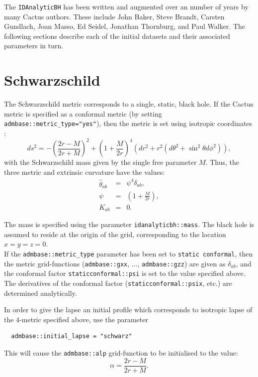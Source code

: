 \documentclass{article}
\begin{document}
The \texttt{IDAnalyticBH} has been written and augmented over an number of
years by many Cactus authors. These include John Baker, Steve Brandt,
Carsten Gundlach, Joan Masso, Ed Seidel, Jonathan Thornburg, and
Paul Walker.
The following sections describe each of the initial datasets
and their associated parameters in turn.

\section{Schwarzschild}

The Schwarzschild metric corresponds to a single, static, black hole.
If the Cactus metric is specified as a conformal metric (by setting
\texttt{admbase::metric\_type="yes"}), then the metric is
set using isotropic coordinates \cite{CactusEinstein_IDAnalyticBH_mtw-isotropic}:
\begin{equation}
  ds^2 = -\left(\frac{2r - M}{2r + M}\right)^2
  + \left(1 + \frac{M}{2r}\right)^4 \left(dr^2 + r^2(d\theta^2
  + \sin^2\theta d\phi^2)\right),
\end{equation}
with the Schwarzschild mass given by the single free parameter $M$.
Thus, the three metric and extrinsic curvature have the values:
\begin{eqnarray}
  \hat{g}_{ab} & = & \psi^4 \delta_{ab}, \\
  \psi & = & (1 + \frac{M}{2r}), \\
  K_{ab} & = & 0.
\end{eqnarray}

The mass is specified using the parameter
\texttt{idanalyticbh::mass}. The black hole is assumed to reside at
the origin of the grid, corresponding to the location $x=y=z=0$.\\

If the \texttt{admbase::metric\_type} parameter has been set to {\tt static conformal}, then
the metric grid-functions (\texttt{admbase::gxx}, $\ldots$,
\texttt{admbase::gzz}) are given as $\delta_{ab}$, and the conformal
factor \texttt{staticconformal::psi} is set to the value specified
above. The derivatives of the conformal factor
(\texttt{staticconformal::psix}, etc.) are determined analytically.

In order to give the lapse an initial profile which corresponds to
isotropic lapse of the $4$-metric specified above, use the parameter
\begin{verbatim}
  admbase::initial_lapse = "schwarz"
\end{verbatim}
This will cause the \texttt{admbase::alp} grid-function to be
initialised to the value:
\begin{equation}
  \alpha = \frac{2r - M}{2r + M}.
\end{equation}
\end{document}
